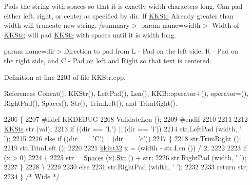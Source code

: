 Pads the string with spaces so that it is exactly \textquotesingle{}width\textquotesingle{} characters long. Can pad either left, right, or center as specified by \textquotesingle{}dir\textquotesingle{}. If \hyperlink{class_k_k_b_1_1_k_k_str}{K\+K\+Str} Already greater than \textquotesingle{}width\textquotesingle{} will truncate new string. /summary$>$ param name=\textquotesingle{}width\textquotesingle{}$>$ Width of \hyperlink{class_k_k_b_1_1_k_k_str}{K\+K\+Str}; will pad \hyperlink{class_k_k_b_1_1_k_k_str}{K\+K\+Str} with spaces until it is width long. 

param name=\textquotesingle{}dir\textquotesingle{}$>$Direction to pad from \textquotesingle{}L\textquotesingle{} -\/ Pad on the left side, \textquotesingle{}R\textquotesingle{} -\/ Pad on the right side, and \textquotesingle{}C\textquotesingle{} -\/ Pad on left and Right so that text is centered.



Definition at line 2203 of file K\+K\+Str.\+cpp.



References Concat(), K\+K\+Str(), Left\+Pad(), Len(), K\+K\+B\+::operator+(), operator=(), Right\+Pad(), Spaces(), Str(), Trim\+Left(), and Trim\+Right().


\begin{DoxyCode}
2206 \{
2207 \textcolor{preprocessor}{  #ifdef  KKDEBUG}
2208   ValidateLen ();
2209 \textcolor{preprocessor}{  #endif}
2210 
2211 
2212   \hyperlink{class_k_k_b_1_1_k_k_str}{KKStr}  str (val);
2213   \textcolor{keywordflow}{if}  ((dir == \textcolor{charliteral}{'L'})  ||  (dir == \textcolor{charliteral}{'l'}))
2214      str.LeftPad  (width, \textcolor{charliteral}{' '});
2215 
2216   \textcolor{keywordflow}{else} \textcolor{keywordflow}{if}  ((dir == \textcolor{charliteral}{'C'})  ||  (dir == \textcolor{charliteral}{'c'}))
2217   \{
2218     str.TrimRight ();
2219     str.TrimLeft ();
2220 
2221     \hyperlink{namespace_k_k_b_a8fa4952cc84fda1de4bec1fbdd8d5b1b}{kkint32}  x = (width - str.Len ()) / 2;
2222 
2223     \textcolor{keywordflow}{if}  (x > 0)
2224     \{
2225       str = \hyperlink{class_k_k_b_1_1_k_k_str_ac6877b554599baa1552acad682f1610f}{Spaces} (x).\hyperlink{class_k_k_b_1_1_k_k_str_ad574e6c0fe7f6ce1ba3ab0a8ce2fbd52}{Str} () + str;
2226       str.RightPad (width, \textcolor{charliteral}{' '});
2227     \}
2228   \}
2229 
2230   \textcolor{keywordflow}{else}
2231     str.RightPad (width, \textcolor{charliteral}{' '});
2232 
2233   \textcolor{keywordflow}{return} str;
2234 \}  \textcolor{comment}{/* Wide */}
\end{DoxyCode}
